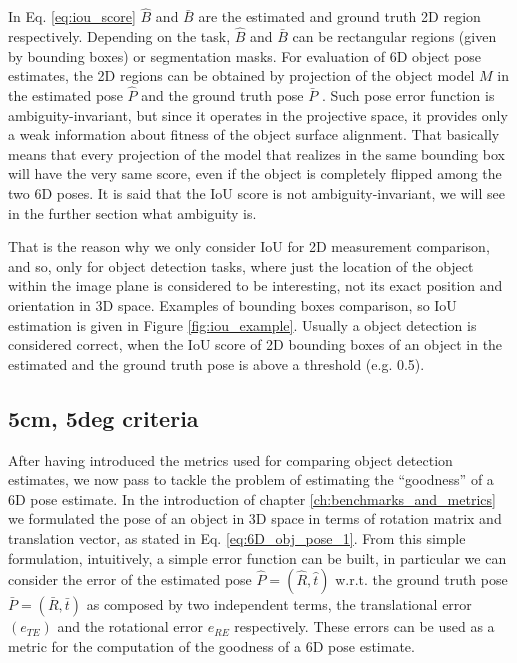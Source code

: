 In Eq. \ref{eq:iou_score} $\hat{B}$ and $\bar{B}$ are the estimated and ground truth 2D region respectively. Depending on the task, $\hat{B}$ and $\bar{B}$ can be rectangular regions (given by bounding boxes) or segmentation masks. For evaluation of 6D object pose estimates, the 2D regions can be obtained by projection of the object model $\mathit{M}$ in the estimated pose $\hat{P}$ and the ground truth pose $\bar{P}$ . Such pose error function is ambiguity-invariant, but since it operates in the projective space, it provides only a weak information about fitness of the object surface alignment. That basically means that every projection of the model that realizes in the same bounding box will have the very same score, even if the object is completely flipped among the two 6D poses. It is said that the IoU score is not ambiguity-invariant, we will see in the further section what ambiguity is. 

That is the reason why we only consider IoU for 2D measurement comparison, and so, only for object detection tasks, where just the location of the object within the image plane is considered to be interesting, not its exact position and orientation in 3D space. Examples of bounding boxes comparison, so IoU estimation is given in Figure \ref{fig:iou_example}. Usually a object detection is considered correct, when the IoU score of 2D bounding boxes of an object in the estimated and the ground truth pose is above a
threshold (e.g. 0.5).

\subsection{5cm, 5deg criteria}\label{subsec:5cm5deg}
After having introduced the metrics used for comparing object detection estimates, we now pass to tackle the problem of estimating the ``goodness'' of a 6D pose estimate. In the introduction of chapter \ref{ch:benchmarks_and_metrics} we formulated the pose of an object in 3D space in terms of rotation  matrix and translation vector, as stated in Eq. \ref{eq:6D_obj_pose_1}. From this simple formulation, intuitively, a simple error function can be built, in particular we can consider the error of the estimated pose $\hat{P} = (\hat{R}, \hat{t})$ w.r.t. the ground truth pose $\bar{P} = (\bar{R}, \bar{t})$ as composed by two independent terms, the translational error $(e_{TE})$ and the rotational error $e_{RE}$ respectively. These errors can be used as a metric for the computation of the goodness of a 6D pose estimate.

